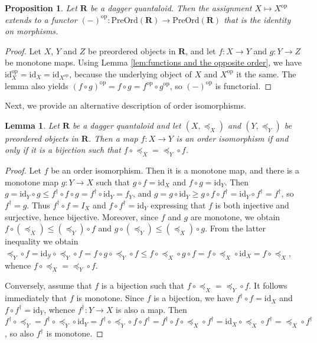\documentclass[12pt]{tac}
\newtheorem{lemma}[theorem]{Lemma}
\newtheorem{proposition}[theorem]{Proposition}
\theoremstyle{definition}
\theoremstyle{remark}
\newcommand{\Y}{\mathcal Y}
\newcommand{\qo}{{\boldsymbol{\preccurlyeq}}}
\newcommand{\<}{\langle}
\renewcommand{\>}{\rangle}
\renewcommand{\:}{\colon}
\newcommand{\op}{\mathrm{op}}
\newcommand{\id}{\mathrm{id}}
\begin{document}
\begin{proposition}\label{functor opposite preorder functor}
Let $\mathbf R$ be a dagger quantaloid. Then the assignment $X\mapsto X^\op$ extends to a functor $(-)^\mathrm{op}:\mathrm{PreOrd}(\mathbf R)\to\mathrm{PreOrd}(\mathbf{R})$ that is the identity on morphisms.
\end{proposition}
\begin{proof}Let $X$, $Y$ and $Z$ be preordered objects in $\mathbf R$, and let $f:X\to Y$ and $g:Y\to Z$ be monotone maps. 
Using Lemma \ref{lem:functions and the opposite order}, we have $\id_X^\op=\id_X=\id_{X^\op}$, because the underlying object of $X$ and $X^\op$ it the same. The lemma also yields $(f\circ g)^\op=f\circ g=f^\op\circ g^\op$, so $(-)^\op$ is functorial.
\end{proof}



Next, we provide an alternative description of order isomorphisms.


\begin{lemma}\label{lem:characterization of order isomorphisms}
Let $\mathbf R$ be a dagger quantaloid and let $(X,\qo_X)$ and $(Y,\qo_Y)$ be preordered objects in $\mathbf R$. Then a map $f:X\to Y$ is an order isomorphism if and only if it is a bijection such that $f\circ \qo_X=\qo_Y\circ f$.
\end{lemma}
\begin{proof}
Let $f$ be an order isomorphism. Then it is a monotone map, and there is a monotone
map $g:Y\to X$ such that $g\circ f=\id_X$ and $f\circ g=\id_Y$. Then $g=\id_Y\circ
g\leq f^\dag\circ f\circ g=f^\dag\circ \id_Y=f_Y$, and $g=g\circ \id_Y\geq g\circ
f\circ f^\dag=\id_Y\circ f^\dag=f^\dag$, so $f^\dag=g$. Thus $f^\dag\circ f=I_X$ and
$f\circ f^\dag=\id_Y$ expressing that $f$ is both injective and surjective, hence
bijective. Moreover, since $f$ and $g$ are monotone, we obtain $f\circ (\qo_X)\leq
(\qo_Y)\circ f$ and $g\circ (\qo_Y)\leq (\qo_X)\circ g$. From the latter inequality
we obtain $\qo_Y\circ f=\id_\Y\circ \qo_Y\circ f=f\circ g\circ \qo_Y\circ f\leq
f\circ \qo_X\circ g\circ f=f\circ \qo_X\circ \id_X=f\circ \qo_X$, whence $f\circ
\qo_X=\qo_Y\circ f$.

Conversely, assume that $f$ is a bijection such that $f\circ \qo_X=\qo_Y\circ f$. It follows immediately that $f$ is monotone. Since $f$ is a bijection, we have $f^\dag\circ f=\id_X$ and $f\circ f^\dag=\id_Y$, whence $f^\dag:Y\to X$ is also a map. Then $f^\dag\circ \qo_Y=f^\dag\circ \qo_Y\circ \id_Y=f^\dag\circ \qo_Y\circ f\circ f^\dag=f^\dag\circ f\circ \qo_X\circ f^\dag=\id_X\circ \qo_X\circ f^\dag=\qo_X\circ f^\dag$, so also $f^\dag$ is monotone.
\end{proof}
\end{document}
